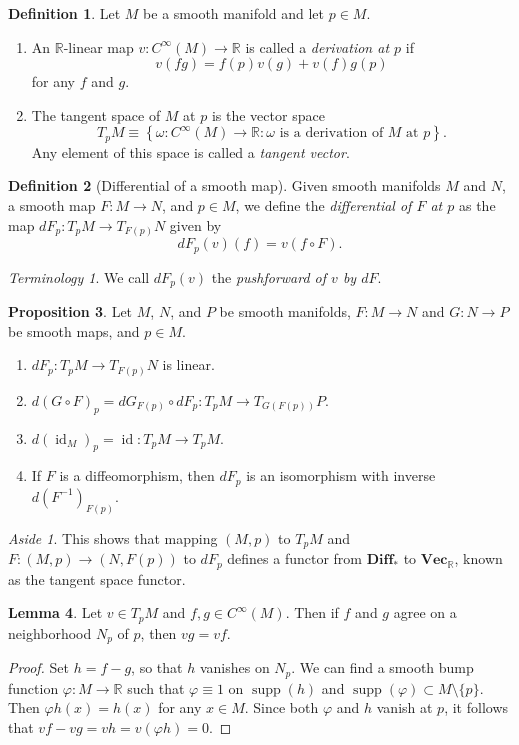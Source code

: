 \documentclass[10pt,letterpaper,cm]{nupset}
\theoremstyle{definition}
\newtheorem{definition}{Definition}[subsection]
\theoremstyle{theorem}
\newtheorem{lemma}[definition]{Lemma}
\newtheorem{prop}[definition]{Proposition}
\theoremstyle{remark}
\newtheorem*{aside}{Aside}
\newtheorem*{term}{Terminology}
\newcommand{\R}{\mathbb R}
\newcommand{\1}{\mathbf{1}}
\newcommand{\0}{\vec 0}
\DeclareMathOperator{\id}{id}
\DeclareMathOperator{\supp}{supp}
\begin{document}
\begin{definition} Let $M$ be a smooth manifold and let $p\in M$.
\begin{enumerate}
\item An $\R$-linear map $v: C^{\infty}(M) \to \R$ is called a \textit{derivation at $p$} if $$v(fg) = f(p)v(g) + v(f)g(p)$$ for any $f$ and $g$.
\item The tangent space of $M$ at $p$ is the vector space
$$T_pM \equiv \left\{\omega : C^{\infty}(M) \to \R : \omega \text{ is a derivation of $M$ at }p\right\}.$$ Any element of this space is called a \textit{tangent vector}.
\end{enumerate}
\end{definition}

\begin{definition}[Differential of a smooth map]
Given smooth manifolds $M$ and $N$, a smooth map $F: M \to N$, and $p\in M$,  we define the \textit{differential of $F$ at $p$} as the map $dF_p: T_pM \to T_{F(p)}N$ given by $$dF_p(v)(f) = v(f \circ F).$$
\end{definition}

\begin{term}
We call $dF_p(v)$ the \textit{pushforward of $v$ by $dF$}.
\end{term}

\begin{prop}
Let $M$, $N$, and $P$ be  smooth manifolds, $F: M \to N$ and $G: N \to P$ be smooth maps, and $p\in M$. 
\begin{enumerate}
\item $dF_p: T_pM \to T_{F(p)}N$ is linear. 
\item $d(G \circ F)_p = dG_{F(p)} \circ dF_p : T_pM \to T_{G(F(p))}P$.
\item $d(\id_M)_p = \id : T_pM \to T_pM$.
\item If $F$ is a diffeomorphism, then $dF_p$ is an isomorphism with inverse $d(F^{-1})_{F(p)}$.
\end{enumerate}
\end{prop}

\begin{aside}
This shows that mapping $(M, p)$ to $T_pM$ and $F: (M, p) \to \left(N, F(p)\right)$ to $dF_p$ defines a functor from $\mathbf{Diff}_{\ast}$ to $\mathbf{Vec}_{\R}$, known as the tangent space functor.
\end{aside}

\begin{lemma}
Let $v \in T_pM$ and $f, g\in C^{\infty}(M)$. Then if $f$ and $g$ agree on a neighborhood $N_p$ of $p$, then $vg = vf$. 
\end{lemma}
\begin{proof}
Set $h = f-g$, so that $h$ vanishes on $N_p$. We can find a smooth bump function $\varphi: M \to \R$ such that $\varphi \equiv 1$ on $\supp(h)$ and $\supp(\varphi) \subset M \setminus \{p\}$. Then $\varphi h(x) = h(x)$ for any $x\in M$. Since both $\varphi$ and $h$ vanish at $p$, it follows that $vf -vg = vh = v(\varphi h) = 0.$
\end{proof}
\end{document}
